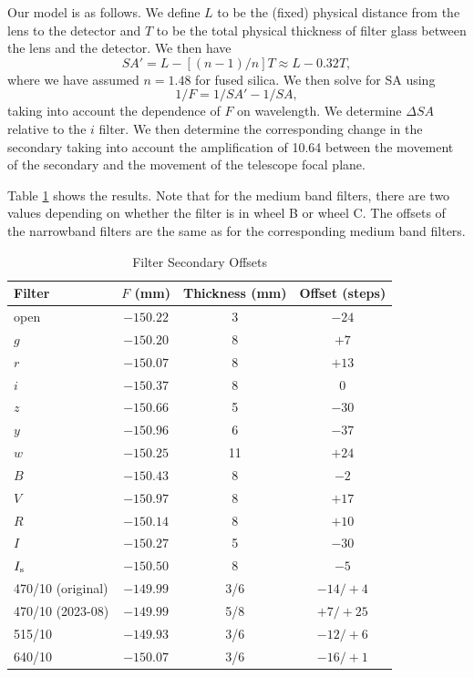 Our model is as follows. We define $L$ to be the (fixed) physical distance from the lens to the detector and $T$ to be the total physical thickness of filter glass between the lens and the detector. We then have
$$
SA' = L - [(n - 1) / n] T \approx L - 0.32 T,
$$
where we have assumed $n = 1.48$ for fused silica. We then solve for SA using
$$
1/F = 1/SA' - 1/SA,
$$
taking into account the dependence of $F$ on wavelength. We determine $\Delta SA$ relative to the $i$ filter. We then determine the corresponding change in the secondary taking into account the amplification of 10.64 between the movement of the secondary and the movement of the telescope focal plane.

Table \ref{table:huitzi-f20-filter-secondary-offsets} shows the results. Note that for the medium band filters, there are two values depending on whether the filter is in wheel B or wheel C. The offsets of the narrowband filters are the same as for the corresponding medium band filters.

\begin{table}
\begin{center}
\caption{Filter Secondary Offsets}
\label{table:huitzi-f20-filter-secondary-offsets}
\medskip
\begin{tabular}{lccc}
\hline
Filter&$F$ (mm)&Thickness (mm)&Offset (steps)\\
\hline
open		&$-150.22$		&\phantom{0}3		&\phantom{}$-24$\\
$g$		&$-150.20$		&\phantom{0}8		&\phantom{0}$+7$\\
$r$		&$-150.07$		&\phantom{0}8		&\phantom{}$+13$\\
$i$			&$-150.37$		&\phantom{0}8		&\phantom{+0}$0$\\
$z$		&$-150.66$		&\phantom{0}5		&\phantom{}$-30$\\
$y$		&$-150.96$		&\phantom{0}6		&\phantom{}$-37$\\
$w$		&$-150.25$		&\phantom{}11		&\phantom{}$+24$\\
$B$		&$-150.43$		&\phantom{0}8		&\phantom{0}$-2$\\
$V$		&$-150.97$		&\phantom{0}8		&\phantom{}$+17$\\
$R$		&$-150.14$		&\phantom{0}8		&\phantom{}$+10$\\
$I$		&$-150.27$		&\phantom{0}5		&\phantom{}$-30$\\
$\mbox{$I_\mathrm{s}$}$		&$-150.50$		&\phantom{0}8		&\phantom{0}$-5$\\
470/10 (original)	&$-149.99$		&\phantom{}3/6		&\phantom{}$-14/+4$\\
470/10 (2023-08)	&$-149.99$		&\phantom{}5/8		&\phantom{}$+7/+25$\\
515/10	&$-149.93$		&\phantom{}3/6		&\phantom{}$-12/+6$\\
640/10	&$-150.07$		&\phantom{}3/6		&\phantom{}$-16/+1$\\
\hline
\end{tabular}
\end{center}
\end{table}

